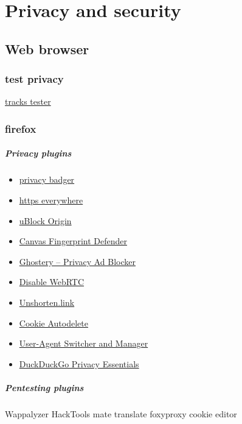 \part{Privacy and security}





%

\chapter{Web browser}

\section{test privacy}
\href{https://coveryourtracks.eff.org/}{tracks tester}


\section{firefox}
\subsubsection{Privacy plugins}
\begin{itemize}
    \item \href{https://addons.mozilla.org/en-US/firefox/addon/privacy-badger17/}{privacy badger}
    \item
        \href{https://addons.mozilla.org/en-US/firefox/addon/https-everywhere/}{https
        everywhere}
    \item 
        \href{https://addons.mozilla.org/en-US/firefox/addon/ublock-origin/}{uBlock
        Origin}
    \item
        \href{https://addons.mozilla.org/en-US/firefox/addon/canvas-fingerprint-defender/}{Canvas
        Fingerprint Defender}
    \item 
        \href{https://addons.mozilla.org/en-US/firefox/addon/ghostery/}{Ghostery
        – Privacy Ad Blocker}
    \item 
        \href{https://addons.mozilla.org/en-US/firefox/addon/happy-bonobo-disable-webrtc/}{Disable
        WebRTC}
    \item
        \href{https://addons.mozilla.org/en-US/firefox/addon/unshort-link/}{Unshorten.link}

    \item
        \href{https://addons.mozilla.org/en-US/firefox/addon/cookie-autodelete/}{Cookie
        Autodelete}
    \item 
        \href{https://addons.mozilla.org/en-US/firefox/addon/user-agent-string-switcher/}{User-Agent
        Switcher and Manager}
    \item 
        \href{https://addons.mozilla.org/en-US/firefox/addon/duckduckgo-for-firefox/}{DuckDuckGo
        Privacy Essentials}
\end{itemize}

\subsubsection{Pentesting plugins}

Wappalyzer
HackTools
mate translate
foxyproxy
cookie editor


